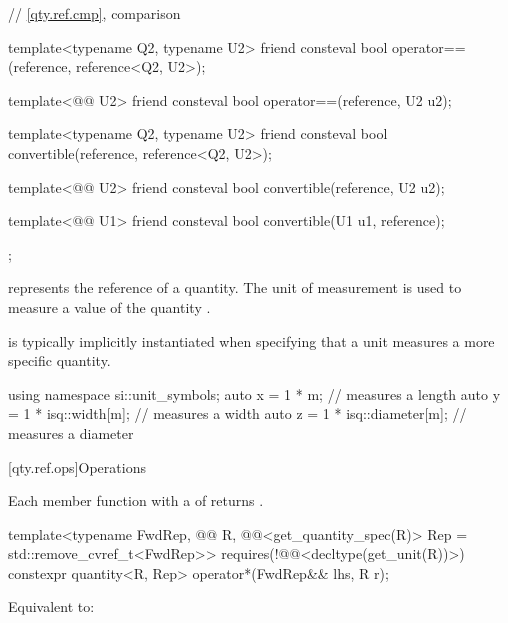 \begin{codeblock}
{{  // \ref{qty.ref.cmp}, comparison

  template<typename Q2, typename U2>
  friend consteval bool operator==(reference, reference<Q2, U2>);

  template<@@ U2>
  friend consteval bool operator==(reference, U2 u2);

  template<typename Q2, typename U2>
  friend consteval bool convertible(reference, reference<Q2, U2>);

  template<@@ U2>
  friend consteval bool convertible(reference, U2 u2);

  template<@@ U1>
  friend consteval bool convertible(U1 u1, reference);
};

}
\end{codeblock}

\pnum
{} represents the reference of a quantity.
The unit of measurement 
is used to measure a value of the quantity .
\begin{note}
 is typically implicitly instantiated
when specifying that a unit measures a more specific quantity.
\begin{example}
\begin{codeblock}
using namespace si::unit_symbols;
auto x = 1 * m;                 // measures a length
auto y = 1 * isq::width[m];     // measures a width
auto z = 1 * isq::diameter[m];  // measures a diameter
\end{codeblock}
\end{example}
\end{note}

[qty.ref.ops]{Operations}

\pnum
Each member function with a 
of 
returns \tcode{\{\}}.

\begin{itemdecl}
template<typename FwdRep, @@ R,
         @@<get_quantity_spec(R{})> Rep = std::remove_cvref_t<FwdRep>>
  requires(!@@<decltype(get_unit(R{}))>)
constexpr quantity<R{}, Rep> operator*(FwdRep&& lhs, R r);
\end{itemdecl}

\begin{itemdescr}
\pnum
\effects
Equivalent to:
\end{itemdescr}

